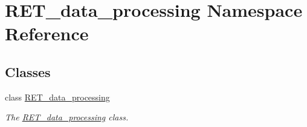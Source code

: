 \hypertarget{namespaceRET__data__processing}{}\section{R\+E\+T\+\_\+data\+\_\+processing Namespace Reference}
\label{namespaceRET__data__processing}
\subsection*{Classes}
\begin{DoxyCompactItemize}
\item 
class \hyperlink{classRET__data__processing_1_1RET__data__processing}{R\+E\+T\+\_\+data\+\_\+processing}
\begin{DoxyCompactList}\small\item\em The \hyperlink{classRET__data__processing_1_1RET__data__processing}{R\+E\+T\+\_\+data\+\_\+processing} class. \end{DoxyCompactList}\end{DoxyCompactItemize}
